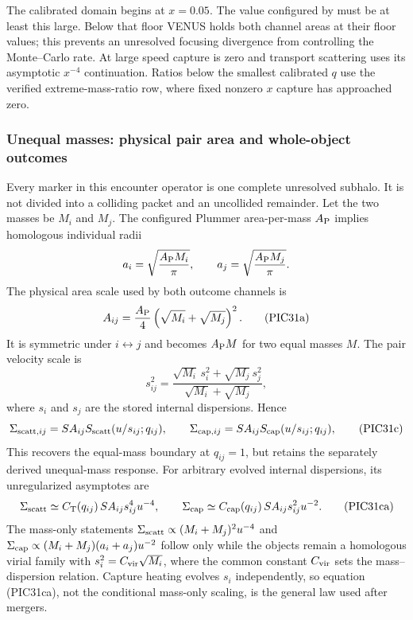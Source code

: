 The calibrated domain begins at \(x=0.05\).  The value configured by
 must be at least this large.  Below
that floor VENUS holds both channel areas at their floor values; this prevents
an unresolved focusing divergence from controlling the Monte--Carlo rate.
At large speed capture is zero and transport scattering uses its asymptotic
\(x^{-4}\) continuation.  Ratios below the smallest calibrated \(q\) use the
verified extreme-mass-ratio row, where fixed nonzero \(x\) capture has
approached zero.

\subsubsection{Unequal masses: physical pair area and whole-object outcomes}

Every marker in this encounter operator is one complete unresolved subhalo.
It is not divided into a colliding packet and an uncollided remainder.  Let
the two masses be \(M_i\) and \(M_j\).  The configured Plummer
area-per-mass \(A_{\rm P}\) implies homologous individual radii
\[
 a_i=\sqrt{\frac{A_{\rm P}M_i}{\pi}},\qquad
 a_j=\sqrt{\frac{A_{\rm P}M_j}{\pi}}.
\]
The physical area scale used by both outcome channels is
\[
 A_{ij}=\frac{A_{\rm P}}{4}
        \left(\sqrt{M_i}+\sqrt{M_j}\right)^2.              \tag{PIC31a}
\]
It is symmetric under \(i\leftrightarrow j\) and becomes \(A_{\rm P}M\)
for two equal masses \(M\).  The pair velocity scale is
\[
 s_{ij}^2=
 \frac{\sqrt{M_i}\,s_i^2+\sqrt{M_j}\,s_j^2}
      {\sqrt{M_i}+\sqrt{M_j}},                            \tag{PIC31b}
\]
where \(s_i\) and \(s_j\) are the stored internal dispersions.  Hence
\[
 \Sigma_{{\rm scatt},ij}=S A_{ij}S_{\rm scatt}(u/s_{ij};q_{ij}),
 \qquad
 \Sigma_{{\rm cap},ij}=S A_{ij}S_{\rm cap}(u/s_{ij};q_{ij}),     \tag{PIC31c}
\]
This recovers the equal-mass boundary at \(q_{ij}=1\), but retains the
separately derived unequal-mass response.
For arbitrary evolved internal dispersions, its unregularized asymptotes are
\[
 \Sigma_{\rm scatt}\simeq
 C_{\rm T}(q_{ij})\,S A_{ij}s_{ij}^{4}u^{-4},
 \qquad
 \Sigma_{\rm cap}\simeq
 C_{\rm cap}(q_{ij})\,S A_{ij}s_{ij}^{2}u^{-2}.          \tag{PIC31ca}
\]
The mass-only statements
\(\Sigma_{\rm scatt}\propto(M_i+M_j)^2u^{-4}\) and
\(\Sigma_{\rm cap}\propto(M_i+M_j)(a_i+a_j)u^{-2}\) follow only while the
objects remain a homologous virial family with
\(s_i^2=C_{\rm vir}\sqrt{M_i}\), where the common constant \(C_{\rm vir}\)
sets the mass--dispersion relation.  Capture heating evolves \(s_i\)
independently, so equation (PIC31ca), not the conditional mass-only scaling,
is the general law used after mergers.

